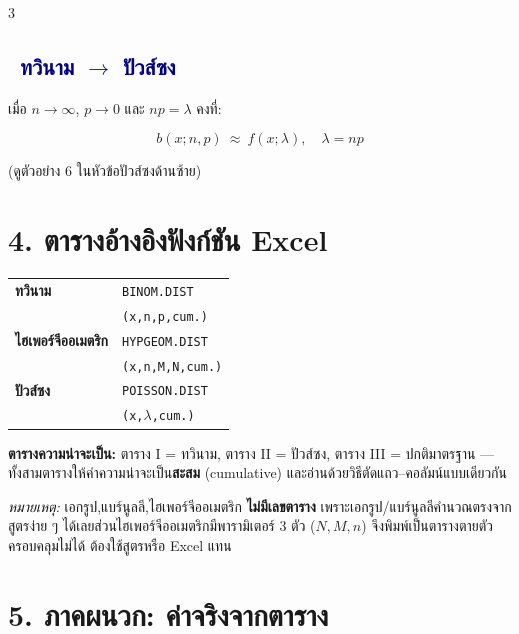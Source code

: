 \documentclass[9pt]{extarticle}
\newcommand{\dist}[1]{\subsection*{\textcolor{navy}{\textbullet\ #1}}}
\begin{document}
\begin{multicols}{3}
\dist{ทวินาม $\to$ ปัวส์ซง}
เมื่อ $n\to\infty$, $p\to0$ และ $np=\lambda$ คงที่:
\begin{formulabox}
$$b(x;n,p)\ \approx\ f(x;\lambda),\quad \lambda=np$$
\end{formulabox}
(ดูตัวอย่าง 6 ในหัวข้อปัวส์ซงด้านซ้าย)

\section*{4. ตารางอ้างอิงฟังก์ชัน Excel}
\begin{formulabox}
\begin{tabular}{@{}ll@{}}
\textbf{ทวินาม} & \texttt{BINOM.DIST}\\
& \texttt{(x,n,p,cum.)}\\
\textbf{ไฮเพอร์จีออเมตริก} & \texttt{HYPGEOM.DIST}\\
& \texttt{(x,n,M,N,cum.)}\\
\textbf{ปัวส์ซง} & \texttt{POISSON.DIST}\\
& \texttt{(x,$\lambda$,cum.)}\\
\end{tabular}
\end{formulabox}

\textbf{ตารางความน่าจะเป็น:} ตาราง I = ทวินาม, ตาราง II = ปัวส์ซง, ตาราง III = ปกติมาตรฐาน — ทั้งสามตารางให้ค่าความน่าจะเป็น\textbf{สะสม} (cumulative) และอ่านด้วยวิธีตัดแถว--คอลัมน์แบบเดียวกัน

\textit{หมายเหตุ:} เอกรูป,\allowbreak แบร์นูลลี,\allowbreak ไฮเพอร์จีออเมตริก \textbf{ไม่มีเลขตาราง} เพราะเอกรูป/\allowbreak แบร์นูลลี\allowbreak คำนวณตรงจาก\allowbreak สูตรง่าย ๆ ได้เลย\allowbreak ส่วนไฮเพอร์จีออเมตริก\allowbreak มีพารามิเตอร์ 3 ตัว ($N,M,n$) จึงพิมพ์เป็น\allowbreak ตารางตายตัว\allowbreak ครอบคลุมไม่ได้ ต้องใช้สูตร\allowbreak หรือ Excel แทน

\end{multicols}
\newpage
\section*{5. ภาคผนวก: ค่าจริงจากตาราง}
\end{document}
